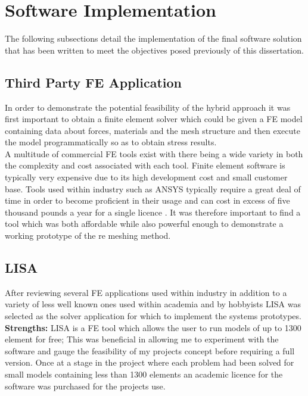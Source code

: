 
\section{Software Implementation}
The following subsections detail the implementation of the final software solution that has been written to meet the objectives posed previously of this dissertation.

\subsection{Third Party FE Application}
In order to demonstrate the potential feasibility of the hybrid approach it was first important to obtain a finite element solver which could be given a FE model containing data about forces, materials and the mesh structure and then execute the model programmatically so as to obtain stress results. \\ 

\noindent
A multitude of commercial FE tools exist with there being a wide variety in both the complexity and cost associated with each tool. 
Finite element software is typically very expensive due to its high development cost and small customer base. Tools used within industry such as ANSYS typically require a great deal of time in order to become proficient in their usage and can cost in excess of five thousand pounds a year for a single licence \cite{AnsysCost}. It was therefore important to find a tool which was both affordable while also powerful enough to demonstrate a working prototype of the re meshing method.
 
\subsection{LISA}
After reviewing several FE applications used within industry in addition to a variety of less well known ones used within academia and by hobbyists LISA  was selected as the solver application for which to implement  the systems prototypes. \\ 

\noindent
\textbf{Strengths: }LISA is a FE tool which allows the user to run models of up to 1300 element for free; This was beneficial in allowing me to experiment with the software and gauge the feasibility of my projects concept before requiring a full version. Once at a stage in the project where each problem had been solved for small models containing less than 1300 elements an academic licence for the software was purchased for the projects use. \\

